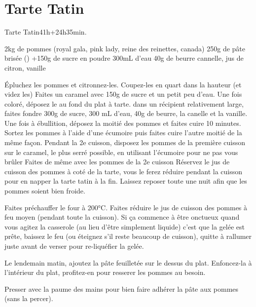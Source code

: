 {\section{Tarte Tatin}
\begin{recette}{Tarte Tatin}{4}{1h+24h}{35min.}
\begin{ingredients}
\ingredient 2kg de pommes (royal gala, pink lady, reine des reinettes, canada)
\ingredient 250g de pâte brisée ()
+150g de sucre en poudre
\ingredient 300mL d'eau
\ingredient 40g de beurre
\ingredient cannelle, jus de citron, vanille
\end{ingredients}

\begin{preparation}
\etape Épluchez les pommes et citronnez-les.
\etape Coupez-les en quart dans la hauteur (et videz les)
\etape Faites un caramel avec 150g de sucre et un petit peu d'eau. Une fois coloré, déposez le au fond du plat à tarte. 
\etape dans un récipient relativement large, faites fondre 300g de sucre, 300 mL d'eau, 40g de beurre, la canelle et la 
vanille. 
\etape Une fois à ébullition, déposez la moitié des pommes et faites cuire 10 minutes. 
\etape Sortez les pommes à l'aide d'une écumoire puis faites 
cuire l'autre moitié de la même façon. Pendant la 2e cuisson, disposez les pommes de la première cuisson sur le caramel, le plus serré possible, en utilisant l'écumoire pour ne pas vous brûler
\etape Faites de même avec les pommes de la 2e cuisson
\etape Réservez le jus de cuisson des pommes à coté de la tarte, vous le ferez réduire pendant la cuisson pour en napper la 
tarte tatin à la fin.
\etape Laissez reposer toute une nuit afin que les pommes soient bien froide.
\end{preparation}

\begin{cuisson}
Faites préchauffer le four à 200°C. Faites réduire le jus de cuisson des pommes à feu moyen (pendant toute la cuisson). Si ça 
commence à être onctueux quand vous agitez la casserole (au lieu d'être simplement liquide) c'est que la gelée est prête, 
baissez le feu (ou éteignez s'il reste beaucoup de cuisson), quitte à rallumer juste avant de verser pour re-liquéfier la gelée.

Le lendemain matin, ajoutez la pâte feuilletée sur le dessus du plat. Enfoncez-la à l'intérieur du plat, profitez-en pour 
resserer les pommes au besoin. 

Presser avec la paume des mains pour bien faire adhérer la pâte aux pommes (sans la percer). 


\end{cuisson}
\end{recette}}

